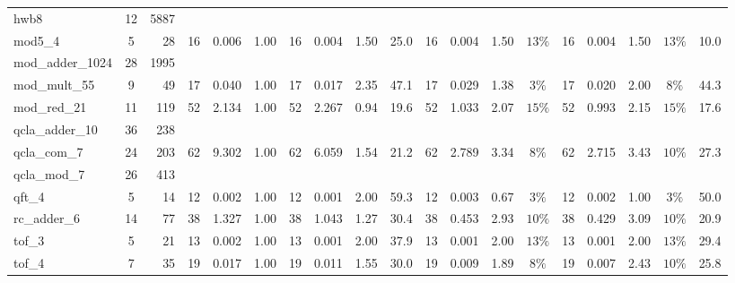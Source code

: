 \begin{table}[H]
\begin{tabular}{l c r | r r r | r r r r | r r r c | r r r c r}
hwb8 & 12 & 5887 &  &  &  &  &  &  &  &  &  &  &  &  &  &  &  &  \\
mod5\_4 & 5 & 28 & \cellcolor{bestT}16 & 0.006 & 1.00 & \cellcolor{bestT}16 & 0.004 & \cellcolor{bestTime}1.50 & 25.0 & \cellcolor{bestT}16 & 0.004 & \cellcolor{bestTime}1.50 & $13\%$ & \cellcolor{bestT}16 & 0.004 & \cellcolor{bestTime}1.50 & $13\%$ & 10.0 \\
mod\_adder\_1024 & 28 & 1995 &  &  &  &  &  &  &  &  &  &  &  &  &  &  &  &  \\
mod\_mult\_55 & 9 & 49 & \cellcolor{bestT}17 & 0.040 & 1.00 & \cellcolor{bestT}17 & 0.017 & \cellcolor{bestTime}2.35 & 47.1 & \cellcolor{bestT}17 & 0.029 & 1.38 & $3\%$ & \cellcolor{bestT}17 & 0.020 & 2.00 & $8\%$ & 44.3 \\
mod\_red\_21 & 11 & 119 & \cellcolor{bestT}52 & 2.134 & 1.00 & \cellcolor{bestT}52 & 2.267 & 0.94 & 19.6 & \cellcolor{bestT}52 & 1.033 & 2.07 & $15\%$ & \cellcolor{bestT}52 & 0.993 & \cellcolor{bestTime}2.15 & $15\%$ & 17.6 \\
qcla\_adder\_10 & 36 & 238 &  &  &  &  &  &  &  &  &  &  &  &  &  &  &  &  \\
qcla\_com\_7 & 24 & 203 & \cellcolor{bestT}62 & 9.302 & 1.00 & \cellcolor{bestT}62 & 6.059 & 1.54 & 21.2 & \cellcolor{bestT}62 & 2.789 & 3.34 & $8\%$ & \cellcolor{bestT}62 & 2.715 & \cellcolor{bestTime}3.43 & $10\%$ & 27.3 \\
qcla\_mod\_7 & 26 & 413 &  &  &  &  &  &  &  &  &  &  &  &  &  &  &  &  \\
qft\_4 & 5 & 14 & \cellcolor{bestT}12 & 0.002 & 1.00 & \cellcolor{bestT}12 & 0.001 & \cellcolor{bestTime}2.00 & 59.3 & \cellcolor{bestT}12 & 0.003 & 0.67 & $3\%$ & \cellcolor{bestT}12 & 0.002 & 1.00 & $3\%$ & 50.0 \\
rc\_adder\_6 & 14 & 77 & \cellcolor{bestT}38 & 1.327 & 1.00 & \cellcolor{bestT}38 & 1.043 & 1.27 & 30.4 & \cellcolor{bestT}38 & 0.453 & 2.93 & $10\%$ & \cellcolor{bestT}38 & 0.429 & \cellcolor{bestTime}3.09 & $10\%$ & 20.9 \\
tof\_3 & 5 & 21 & \cellcolor{bestT}13 & 0.002 & 1.00 & \cellcolor{bestT}13 & 0.001 & \cellcolor{bestTime}2.00 & 37.9 & \cellcolor{bestT}13 & 0.001 & \cellcolor{bestTime}2.00 & $13\%$ & \cellcolor{bestT}13 & 0.001 & \cellcolor{bestTime}2.00 & $13\%$ & 29.4 \\
tof\_4 & 7 & 35 & \cellcolor{bestT}19 & 0.017 & 1.00 & \cellcolor{bestT}19 & 0.011 & 1.55 & 30.0 & \cellcolor{bestT}19 & 0.009 & 1.89 & $8\%$ & \cellcolor{bestT}19 & 0.007 & \cellcolor{bestTime}2.43 & $10\%$ & 25.8 \\

\end{tabular}
\end{table}
